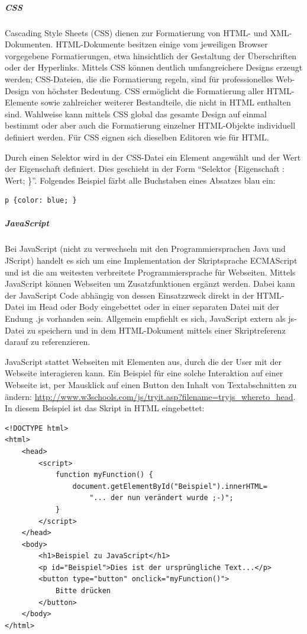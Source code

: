 \subparagraph{CSS}
Cascading Style Sheets (CSS) dienen zur Formatierung von HTML- und XML-Dokumenten. HTML-Dokumente besitzen einige vom jeweiligen Browser vorgegebene Formatierungen, etwa hinsichtlich der Gestaltung der Überschriften oder der Hyperlinks. Mittels CSS können deutlich umfangreichere Designs erzeugt werden; CSS-Dateien, die die Formatierung regeln, sind für professionelles Web-Design von höchster Bedeutung. CSS ermöglicht die Formatierung aller HTML-Elemente sowie zahlreicher weiterer Bestandteile, die nicht in HTML enthalten sind. Wahlweise kann mittels CSS global das gesamte Design auf einmal bestimmt oder aber auch die Formatierung einzelner HTML-Objekte individuell definiert werden. Für CSS eignen sich dieselben Editoren wie für HTML. 

Durch einen Selektor wird in der CSS-Datei ein Element angewählt und der Wert der Eigenschaft definiert. Dies geschieht in der Form "`Selektor \{Eigenschaft : Wert; \}"'. Folgendes Beispiel färbt alle Buchstaben eines Absatzes blau ein:
\lstset{language=HTML}
\begin{lstlisting}[frame=L, xleftmargin=1.5\parindent, rulecolor=\color{ianusGrau}]
p {color: blue; }
\end{lstlisting}


\subparagraph{JavaScript}
Bei JavaScript (nicht zu verwechseln mit den Programmiersprachen Java und JScript) handelt es sich um eine Implementation der Skriptsprache ECMAScript und ist die am weitesten verbreitete Programmiersprache für Webseiten. Mittels JavaScript können Webseiten um Zusatzfunktionen ergänzt werden. Dabei kann der JavaScript Code abhängig von dessen Einsatzzweck direkt in der HTML-Datei im Head oder Body eingebettet oder in einer separaten Datei mit der Endung .js vorhanden sein. Allgemein empfiehlt es sich, JavaScript extern als js-Datei zu speichern und in dem HTML-Dokument mittels einer Skriptreferenz darauf zu referenzieren. 

JavaScript stattet Webseiten mit Elementen aus, durch die der User mit der Webseite interagieren kann. Ein Beispiel für eine solche Interaktion auf einer Webseite ist, per Mausklick auf einen Button den Inhalt von Textabschnitten zu ändern: \url{http://www.w3schools.com/js/tryit.asp?filename=tryjs_whereto_head}. In diesem Beispiel ist das Skript in HTML eingebettet:
\pagebreak
\lstset{language=HTML}
\begin{lstlisting}[frame=L, xleftmargin=1.5\parindent, rulecolor=\color{ianusGrau}]
<!DOCTYPE html>
<html>
	<head>
		<script>
			function myFunction() {
				document.getElementById("Beispiel").innerHTML=
					"... der nun verändert wurde ;-)";
			}
		</script>
	</head>
	<body>
		<h1>Beispiel zu JavaScript</h1>
		<p id="Beispiel">Dies ist der ursprüngliche Text...</p>
		<button type="button" onclick="myFunction()">
			Bitte drücken
		</button>
	</body>
</html>
\end{lstlisting}

